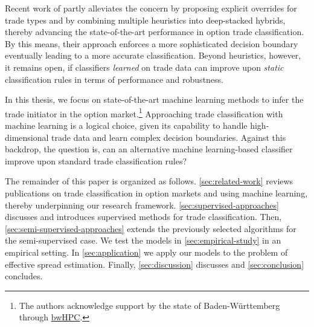 Recent work of \textcite[][13--16]{grauerOptionTradeClassification2022} partly alleviates the concern by proposing explicit overrides for trade types and by combining multiple heuristics into deep-stacked hybrids, thereby advancing the state-of-the-art performance in option trade classification. By this means, their approach enforces a more sophisticated decision boundary eventually leading to a more accurate classification. Beyond heuristics, however, it remains open, if classifiers \emph{learned} on trade data can improve upon \emph{static} classification rules in terms of performance and robustness.

In this thesis, we focus on state-of-the-art machine learning methods to infer the trade initiator in the option market.\footnote{The authors acknowledge support by the state of Baden-Württemberg through \href{https://www.bwhpc.de/}{bwHPC}.} Approaching trade classification with machine learning is a logical choice, given its capability to handle high-dimensional trade data and learn complex decision boundaries. Against this backdrop, the question is, can an alternative machine learning-based classifier improve upon standard trade classification rules?

The remainder of this paper is organized as follows. \cref{sec:related-work} reviews publications on trade classification in option markets and using machine learning, thereby underpinning our research framework. \cref{sec:supervised-approaches} discusses and introduces supervised methods for trade classification. Then, \cref{sec:semi-supervised-approaches} extends the previously selected algorithms for the semi-supervised case. We test the models in \cref{sec:empirical-study} in an empirical setting. In \cref{sec:application} we apply our models to the problem of effective spread estimation. Finally, \cref{sec:discussion} discusses and \cref{sec:conclusion} concludes.
